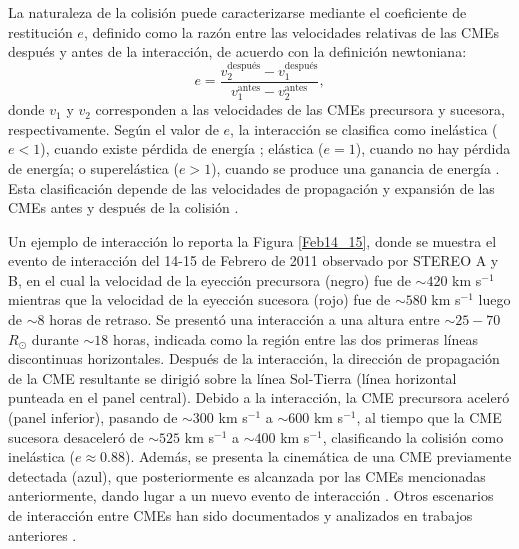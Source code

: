 La naturaleza de la colisión puede caracterizarse mediante el coeficiente de restitución $e$, definido como la razón entre las velocidades relativas de las CMEs después y antes de la interacción, de acuerdo con la definición newtoniana:
\begin{equation*}
\label{coeficientederestitución}
e=\frac{v_2^{\text{después}}-v_1^{\text{después}}}
{v_1^{\text{antes}}-v_2^{\text{antes}}},
\end{equation*}
donde $v_1$ y $v_2$ corresponden a las velocidades de las CMEs precursora y sucesora, respectivamente. Según el valor de $e$, la interacción se clasifica como inelástica ($e<1$), cuando existe pérdida de energía \parencite[e.g.,][]{mishra-2015, mishra-2015b}; elástica ($e=1$), cuando no hay pérdida de energía; o superelástica ($e>1$), cuando se produce una ganancia de energía \parencite[e.g.,][]{shen-2016, colaninno-2015, shen-2017, saitoh-2010}. Esta clasificación depende de las velocidades de propagación y expansión de las CMEs antes y después de la colisión \parencite[e.g.,][]{mishra-2017, lugaz-2013}.

Un ejemplo de interacción lo reporta la Figura \ref{Feb14_15}, donde se muestra el evento de interacción del 14-15 de Febrero de 2011 observado por \ac{STEREO} A y B, en el cual la velocidad de la eyección precursora (negro) fue de $\sim420$ km s$^{-1}$ mientras que la velocidad de la eyección sucesora (rojo) fue de $\sim580$ km s$^{-1}$ luego de $\sim8$ horas de retraso. Se presentó una interacción a una altura entre $\sim25-70$ $R_\odot$ durante $\sim18$ horas, indicada como la región entre las dos primeras líneas discontinuas horizontales. Después de la interacción, la dirección de propagación de la CME resultante se dirigió sobre la línea Sol-Tierra (línea horizontal punteada en el panel central). Debido a la interacción, la CME precursora aceleró (panel inferior), pasando de $\sim300$ km s$^{-1}$ a $\sim600$ km s$^{-1}$, al tiempo que la CME sucesora desaceleró de $\sim525$ km s$^{-1}$ a $\sim400$ km s$^{-1}$, clasificando la colisión como inelástica ($e\approx0.88$). Además, se presenta la cinemática de una CME previamente detectada (azul), que posteriormente es alcanzada por las CMEs mencionadas anteriormente, dando lugar a un nuevo evento de interacción \parencite[e.g.,][]{mishra-2017, mishra-2014}. Otros escenarios de interacción entre CMEs han sido documentados y analizados en trabajos anteriores \parencite[e.g.,][]{liu-2012}.


